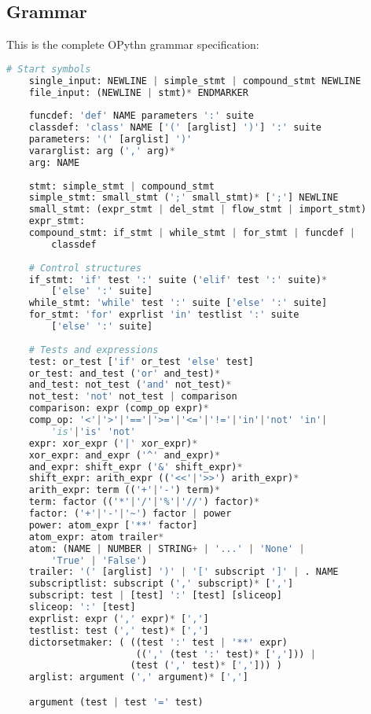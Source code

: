 \documentclass[11pt, twoside]{article}
\begin{document}
    \subsection{Grammar}
    This is the complete OPythn grammar specification:
    \begin{lstlisting}[language=python]
    # Start symbols
    single_input: NEWLINE | simple_stmt | compound_stmt NEWLINE
    file_input: (NEWLINE | stmt)* ENDMARKER
    
    funcdef: 'def' NAME parameters ':' suite
    classdef: 'class' NAME ['(' [arglist] ')'] ':' suite
    parameters: '(' [arglist] ')'
    vararglist: arg (',' arg)*
    arg: NAME
    
    stmt: simple_stmt | compound_stmt
    simple_stmt: small_stmt (';' small_stmt)* [';'] NEWLINE
    small_stmt: (expr_stmt | del_stmt | flow_stmt | import_stmt)
    expr_stmt:  
    compound_stmt: if_stmt | while_stmt | for_stmt | funcdef |
        classdef
    
    # Control structures
    if_stmt: 'if' test ':' suite ('elif' test ':' suite)*
        ['else' ':' suite]
    while_stmt: 'while' test ':' suite ['else' ':' suite]
    for_stmt: 'for' exprlist 'in' testlist ':' suite
        ['else' ':' suite]
    
    # Tests and expressions
    test: or_test ['if' or_test 'else' test]
    or_test: and_test ('or' and_test)*
    and_test: not_test ('and' not_test)*
    not_test: 'not' not_test | comparison
    comparison: expr (comp_op expr)*
    comp_op: '<'|'>'|'=='|'>='|'<='|'!='|'in'|'not' 'in'|
        'is'|'is' 'not'
    expr: xor_expr ('|' xor_expr)*
    xor_expr: and_expr ('^' and_expr)*
    and_expr: shift_expr ('&' shift_expr)*
    shift_expr: arith_expr (('<<'|'>>') arith_expr)*
    arith_expr: term (('+'|'-') term)*
    term: factor (('*'|'/'|'%'|'//') factor)*
    factor: ('+'|'-'|'~') factor | power
    power: atom_expr ['**' factor]
    atom_expr: atom trailer*
    atom: (NAME | NUMBER | STRING+ | '...' | 'None' |
        'True' | 'False')
    trailer: '(' [arglist] ')' | '[' subscript ']' | . NAME
    subscriptlist: subscript (',' subscript)* [',']
    subscript: test | [test] ':' [test] [sliceop]
    sliceop: ':' [test]
    exprlist: expr (',' expr)* [',']
    testlist: test (',' test)* [',']
    dictorsetmaker: ( ((test ':' test | '**' expr)
                       ((',' (test ':' test)* [','])) |
                      (test (',' test)* [','])) )
    arglist: argument (',' argument)* [',']

    argument (test | test '=' test)
    \end{lstlisting}
\end{document}
